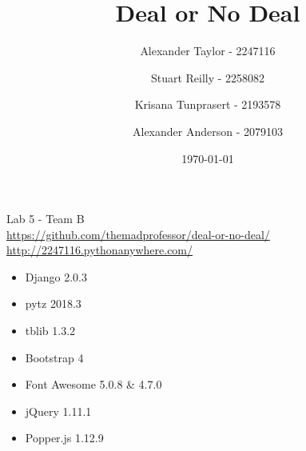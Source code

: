 \documentclass[11pt, a4paper]{article}
\author{Alexander Taylor - 2247116 \and Stuart Reilly - 2258082 \and Krisana Tunprasert - 2193578\and Alexander Anderson - 2079103}
\title{Deal or No Deal}
\date{\today}
\begin{document}
    \maketitle

    Lab 5 - Team B\\
    \url{https://github.com/themadprofessor/deal-or-no-deal/}\\
    \url{http://2247116.pythonanywhere.com/}\\
    \begin{itemize}
        \item Django 2.0.3
        \item pytz 2018.3
        \item tblib 1.3.2
        \item Bootstrap 4
        \item Font Awesome 5.0.8 \& 4.7.0
        \item jQuery 1.11.1
        \item Popper.js 1.12.9
    \end{itemize}
\end{document}
